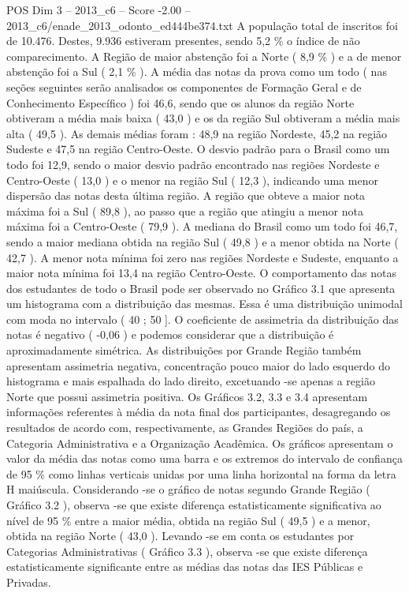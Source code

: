 \begin{textsample}{POS Dim 3 – 2013\_c6 – Score -2.00 – 2013\_c6/enade\_2013\_odonto\_ed444be374.txt}
A população total de inscritos foi de 10.476.
Destes, 9.936 estiveram presentes, sendo 5,2 \% o índice de não comparecimento.
A Região de maior abstenção foi a Norte ( 8,9 \% ) e a de menor abstenção foi a Sul ( 2,1 \% ).
A média das notas da prova como um todo ( nas seções seguintes serão analisados os componentes de Formação Geral e de Conhecimento Específico ) foi 46,6, sendo que os alunos da região Norte obtiveram a média mais baixa ( 43,0 ) e os da região Sul obtiveram a média mais alta ( 49,5 ).
As demais médias foram : 48,9 na região Nordeste, 45,2 na região Sudeste e 47,5 na região Centro-Oeste.
O desvio padrão para o Brasil como um todo foi 12,9, sendo o maior desvio padrão encontrado nas regiões Nordeste e Centro-Oeste ( 13,0 ) e o menor na região Sul ( 12,3 ), indicando uma menor dispersão das notas desta última região.
A região que obteve a maior nota máxima foi a Sul ( 89,8 ), ao passo que a região que atingiu a menor nota máxima foi a Centro-Oeste ( 79,9 ).
A mediana do Brasil como um todo foi 46,7, sendo a maior mediana obtida na região Sul ( 49,8 ) e a menor obtida na Norte ( 42,7 ).
A menor nota mínima foi zero nas regiões Nordeste e Sudeste, enquanto a maior nota mínima foi 13,4 na região Centro-Oeste.
O comportamento das notas dos estudantes de todo o Brasil pode ser observado no Gráfico 3.1 que apresenta um histograma com a distribuição das mesmas.
Essa é uma distribuição unimodal com moda no intervalo ( 40 ; 50 ].
O coeficiente de assimetria da distribuição das notas é negativo ( -0,06 ) e podemos considerar que a distribuição é aproximadamente simétrica.
As distribuições por Grande Região também apresentam assimetria negativa, concentração pouco maior do lado esquerdo do histograma e mais espalhada do lado direito, excetuando -se apenas a região Norte que possui assimetria positiva.
Os Gráficos 3.2, 3.3 e 3.4 apresentam informações referentes à média da nota final dos participantes, desagregando os resultados de acordo com, respectivamente, as Grandes Regiões do país, a Categoria Administrativa e a Organização Acadêmica.
Os gráficos apresentam o valor da média das notas como uma barra e os extremos do intervalo de confiança de 95 \% como linhas verticais unidas por uma linha horizontal na forma da letra H maiúscula.
Considerando -se o gráfico de notas segundo Grande Região ( Gráfico 3.2 ), observa -se que existe diferença estatisticamente significativa ao nível de 95 \% entre a maior média, obtida na região Sul ( 49,5 ) e a menor, obtida na região Norte ( 43,0 ).
Levando -se em conta os estudantes por Categorias Administrativas ( Gráfico 3.3 ), observa -se que existe diferença estatisticamente significante entre as médias das notas das IES Públicas e Privadas.

\end{textsample}
